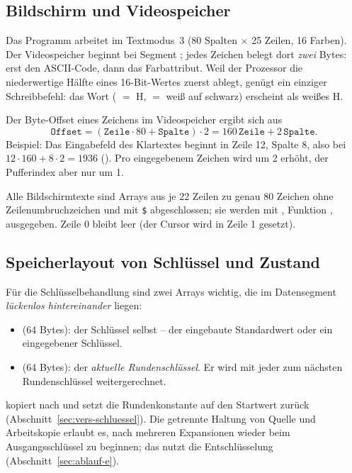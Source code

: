 \subsection{Bildschirm und Videospeicher}\label{sec:video}
Das Programm arbeitet im Textmodus~3 (80 Spalten $\times$ 25 Zeilen, 16 Farben). Der Videospeicher beginnt bei Segment ; jedes Zeichen belegt dort \emph{zwei} Bytes: erst den ASCII-Code, dann das Farbattribut. Weil der Prozessor die niederwertige Hälfte eines 16-Bit-Wertes zuerst ablegt, genügt ein einziger Schreibbefehl: das Wort  ( $=$ \glqq H\grqq,  $=$ weiß auf schwarz) erscheint als weißes \glqq H\grqq.

Der Byte-Offset eines Zeichens im Videospeicher ergibt sich aus
\[
    \mathtt{Offset} = (\mathtt{Zeile}\cdot80+\mathtt{Spalte})\cdot2 = 160\,\mathtt{Zeile}+2\,\mathtt{Spalte}.
\]
Beispiel: Das Eingabefeld des Klartextes beginnt in Zeile 12, Spalte 8, also bei $12\cdot160+8\cdot2=1936$ (). Pro eingegebenem Zeichen wird  um 2 erhöht, der Pufferindex  aber nur um 1.

Alle Bildschirmtexte sind Arrays aus je 22 Zeilen zu genau 80 Zeichen ohne Zeilenumbruchzeichen und mit \texttt{\$} abgeschlossen; sie werden mit , Funktion , ausgegeben. Zeile 0 bleibt leer (der Cursor wird in Zeile 1 gesetzt).

\subsection{Speicherlayout von Schlüssel und Zustand}\label{sec:speicherlayout}
Für die Schlüsselbehandlung sind zwei Arrays wichtig, die im Datensegment \emph{lückenlos hintereinander} liegen:

\begin{itemize}[noitemsep]
    \item {} (64 Bytes): der Schlüssel selbst -- der eingebaute Standardwert oder ein eingegebener Schlüssel.
    \item {} (64 Bytes): der \emph{aktuelle Rundenschlüssel}. Er wird mit jeder  zum nächsten Rundenschlüssel weitergerechnet.
\end{itemize}

 kopiert  nach  und setzt die Rundenkonstante auf den Startwert  zurück (Abschnitt~\ref{sec:vers-schluessel}). Die getrennte Haltung von Quelle und Arbeitskopie erlaubt es, nach mehreren Expansionen wieder beim Ausgangsschlüssel zu beginnen; das nutzt die Entschlüsselung (Abschnitt~\ref{sec:ablauf-e}).
